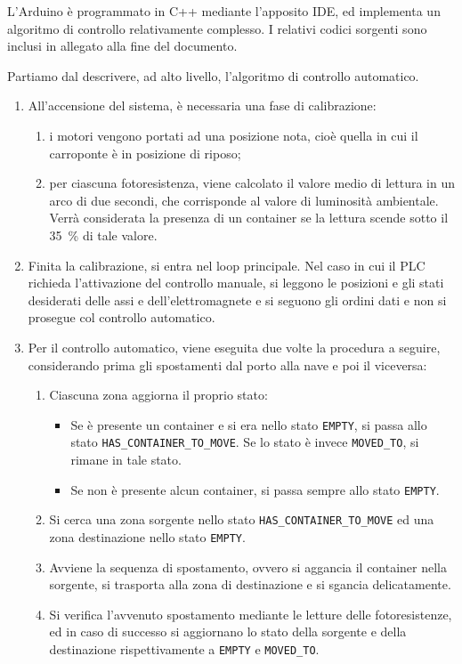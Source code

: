 L'Arduino è programmato in C++ mediante l'apposito IDE, ed implementa un algoritmo di controllo
relativamente complesso. I relativi codici sorgenti sono inclusi in allegato alla fine del
documento.

Partiamo dal descrivere, ad alto livello, l'algoritmo di controllo automatico.
\begin{enumerate}
    \item All'accensione del sistema, è necessaria una fase di calibrazione:
        \begin{enumerate}
            \item i motori vengono portati ad una posizione nota, cioè quella in cui il carroponte è
                in posizione di riposo;
            \item per ciascuna fotoresistenza, viene calcolato il valore medio di lettura in un arco
                di due secondi, che corrisponde al valore di luminosità ambientale. Verrà
                considerata la presenza di un container se la lettura scende sotto il
                \qty{35}{\percent} di tale valore.
        \end{enumerate}
    \item Finita la calibrazione, si entra nel loop principale. Nel caso in cui il PLC richieda
        l'attivazione del controllo manuale, si leggono le posizioni e gli stati desiderati delle
        assi e dell'elettromagnete e si seguono gli ordini dati e non si prosegue col controllo automatico.
    \item Per il controllo automatico, viene eseguita due volte la procedura a seguire, considerando
        prima gli spostamenti dal porto alla nave e poi il viceversa:
        \begin{enumerate}
            \item Ciascuna zona aggiorna il proprio stato:
                \begin{itemize}
                    \item Se è presente un container e si era nello stato \texttt{EMPTY}, si passa
                        allo stato \texttt{HAS\_\-CONTAINER\_\-TO\_\-MOVE}. Se lo stato è invece
                        \texttt{MOVED\_TO}, si rimane in tale stato.
                    \item Se non è presente alcun container, si passa sempre allo stato
                        \texttt{EMPTY}.
                \end{itemize}
            \item Si cerca una zona sorgente nello stato \texttt{HAS\_\-CONTAINER\_\-TO\_\-MOVE} ed
                una zona destinazione nello stato \texttt{EMPTY}.
            \item Avviene la sequenza di spostamento, ovvero si aggancia il container nella
                sorgente, si trasporta alla zona di destinazione e si sgancia delicatamente.
            \item Si verifica l'avvenuto spostamento mediante le letture delle fotoresistenze, ed in
                caso di successo si aggiornano lo stato della sorgente e della destinazione
                rispettivamente a \texttt{EMPTY} e \texttt{MOVED\_TO}.
        \end{enumerate}
\end{enumerate}
